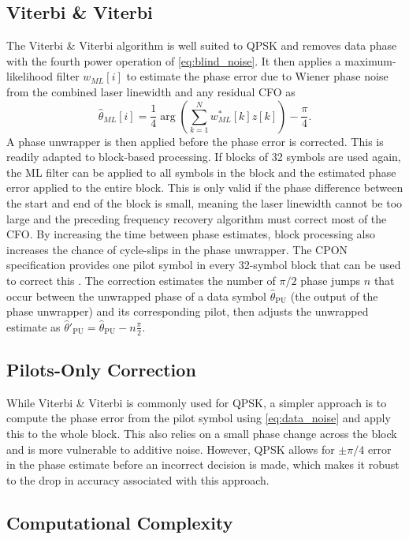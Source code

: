 \documentclass[12pt,a4paper]{report}
\begin{document}
\subsection{Viterbi \& Viterbi}
The Viterbi \& Viterbi algorithm is well suited to QPSK and removes data phase with the fourth power operation of \cref{eq:blind_noise}. It then applies a maximum-likelihood filter \(w_{ML}[i]\) to estimate the phase error due to Wiener phase noise from the combined laser linewidth and any residual CFO as
\begin{equation}
    \hat{\theta}_{ML}[i] = \frac{1}{4} \arg\left(\sum_{k = 1}^{N} w_{ML}^*[k] z[k] \right) - \frac{\pi}{4}.
    \label{eq:viterbi_viterbi}
\end{equation}
A phase unwrapper is then applied before the phase error is corrected. This is readily adapted to block-based processing. If blocks of 32 symbols are used again, the ML filter can be applied to all symbols in the block and the estimated phase error applied to the entire block. This is only valid if the phase difference between the start and end of the block is small, meaning the laser linewidth cannot be too large and the preceding frequency recovery algorithm must correct most of the CFO. By increasing the time between phase estimates, block processing also increases the chance of cycle-slips in the phase unwrapper. The CPON specification provides one pilot symbol in every 32-symbol block that can be used to correct this \cite{Cheng2013PilotCycleSlip}. The correction estimates the number of \(\pi/2\) phase jumps \(n\) that occur between the unwrapped phase of a data symbol \(\hat{\theta}_\mathrm{PU}\) (the output of the phase unwrapper) and its corresponding pilot, then adjusts the unwrapped estimate as \(\hat{\theta}'_\mathrm{PU} = \hat{\theta}_\mathrm{PU} - n\frac{\pi}{2}\).
\subsection{Pilots-Only Correction}
While Viterbi \& Viterbi is commonly used for QPSK, a simpler approach is to compute the phase error from the pilot symbol using \cref{eq:data_noise} and apply this to the whole block. This also relies on a small phase change across the block and is more vulnerable to additive noise. However, QPSK allows for \(\pm \pi/4\) error in the phase estimate before an incorrect decision is made, which makes it robust to the drop in accuracy associated with this approach.

\subsection{Computational Complexity}
\end{document}
